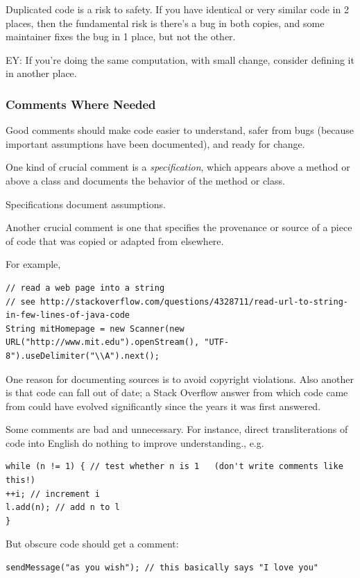 \documentclass[10pt]{amsart}
\begin{document}
Duplicated code is a risk to safety. If you have identical or very similar code in 2 places, then the fundamental risk is there's a bug in both copies, and some maintainer fixes the bug in 1 place, but not the other.

EY: If you're doing the same computation, with small change, consider defining it in another place.

\subsubsection{Comments Where Needed}

Good comments should make code easier to understand, safer from bugs (because important assumptions have been documented), and ready for change.

One kind of crucial comment is a \emph{specification}, which appears above a method or above a class and documents the behavior of the method or class.

Specifications document assumptions. 

Another crucial comment is one that specifies the provenance or source of a piece of code that was copied or adapted from elsewhere. 

For example,

\begin{verbatim}
// read a web page into a string
// see http://stackoverflow.com/questions/4328711/read-url-to-string-in-few-lines-of-java-code
String mitHomepage = new Scanner(new URL("http://www.mit.edu").openStream(), "UTF-8").useDelimiter("\\A").next();
\end{verbatim}

One reason for documenting sources is to avoid copyright violations. Also another is that code can fall out of date; a Stack Overflow answer from which code came from could have evolved significantly since the years it was first answered.

Some comments are bad and unnecessary. For instance, direct transliterations of code into English do nothing to improve understanding., e.g.

\begin{verbatim}
while (n != 1) { // test whether n is 1   (don't write comments like this!)
++i; // increment i
l.add(n); // add n to l
}
\end{verbatim}

But obscure code should get a comment:
\begin{verbatim}
sendMessage("as you wish"); // this basically says "I love you"
\end{verbatim}
\end{document}

